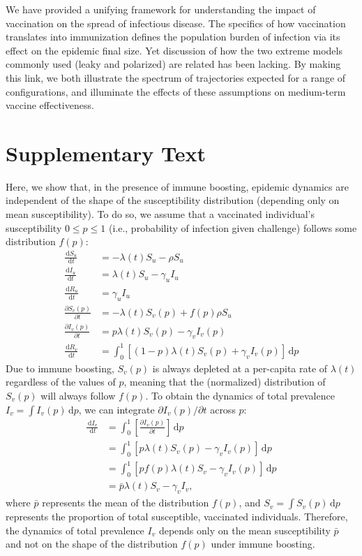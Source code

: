 \documentclass[12pt]{article}
\newcommand{\dd}[1]{\ensuremath{\, \mathrm{d}#1}}
\begin{document}
We have provided a unifying framework for understanding the impact of vaccination on the spread of infectious disease.
The specifics of how vaccination translates into immunization defines the population burden of infection via its effect on the epidemic final size.
Yet discussion of how the two extreme models commonly used (leaky and polarized) are related has been lacking.
By making this link, we both illustrate the spectrum of trajectories expected for a range of configurations, and illuminate the effects of these assumptions on medium-term vaccine effectiveness.

\pagebreak

\section*{Supplementary Text}

Here, we show that, in the presence of immune boosting, epidemic dynamics are independent of the shape of the susceptibility distribution (depending only on mean susceptibility).
To do so, we assume that a vaccinated individual's susceptibility $0 \leq p \leq 1$ (i.e., probability of infection given challenge) follows some distribution $f(p)$:
\begin{align}
\frac{\dd S_u}{\dd t} &= - \lambda(t) S_u - \rho S_u \\
\frac{\dd I_u}{\dd t} &= \lambda(t) S_u - \gamma_u I_u \\
\frac{\dd R_u}{\dd t} &= \gamma_u I_u \\
\frac{\partial S_v(p)}{\partial t} &= - \lambda(t) S_v(p) + f(p) \rho S_u  \\
\frac{\partial I_v(p)}{\partial t} &= p \lambda(t) S_v(p) - \gamma_v I_v(p) \\
\frac{\dd R_v}{\dd t} &= \int_0^1 \left[ (1-p) \lambda(t) S_v(p) + \gamma_v I_v(p) \right]\dd p
\end{align}
Due to immune boosting, $S_v(p)$ is always depleted at a per-capita rate of $\lambda(t)$ regardless of the values of $p$, meaning that the (normalized) distribution of $S_v(p)$ will always follow $f(p)$.
To obtain the dynamics of total prevalence $I_v = \int I_v(p) \dd p$, we can integrate $\partial I_v(p)/\partial t$ across $p$:
\begin{align}
\frac{\dd I_v}{\dd t} &=  \int_0^1\left[\frac{\partial I_v(p)}{\partial t}\right]\dd p\\
&= \int_0^1\left[p \lambda(t) S_v(p) - \gamma_v I_v(p)\right]\dd p\\
&= \int_0^1\left[p f(p) \lambda(t) S_v - \gamma_v I_v(p)\right]\dd p\\
&= \bar{p} \lambda(t) S_v - \gamma_v I_v,
\end{align}
where $\bar{p}$ represents the mean of the distribution $f(p)$, and $S_v = \int S_v(p) \dd p$ represents the proportion of total susceptible, vaccinated individuals.
Therefore, the dynamics of total prevalence $I_v$ depends only on the mean susceptibility $\bar{p}$ and not on the shape of the distribution $f(p)$ under immune boosting.

\pagebreak


\end{document}
